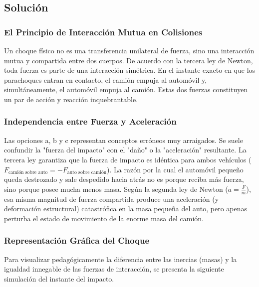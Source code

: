 \documentclass[12pt]{article}
\begin{document}
\subsection*{Solución}

\subsubsection*{El Principio de Interacción Mutua en Colisiones}
Un choque físico no es una transferencia unilateral de fuerza, sino una interacción mutua y compartida entre dos cuerpos. De acuerdo con la tercera ley de Newton, toda fuerza es parte de una interacción simétrica. En el instante exacto en que los parachoques entran en contacto, el camión empuja al automóvil y, simultáneamente, el automóvil empuja al camión. Estas dos fuerzas constituyen un par de acción y reacción inquebrantable.

\subsubsection*{Independencia entre Fuerza y Aceleración}
Las opciones a, b y c representan conceptos erróneos muy arraigados. Se suele confundir la "fuerza del impacto" con el "daño" o la "aceleración" resultante. La tercera ley garantiza que la fuerza de impacto es idéntica para ambos vehículos ($F_{\text{camión sobre auto}} = -F_{\text{auto sobre camión}}$). La razón por la cual el automóvil pequeño queda destrozado y sale despedido hacia atrás no es porque reciba más fuerza, sino porque posee mucha menos masa. Según la segunda ley de Newton ($a = \frac{F}{m}$), esa misma magnitud de fuerza compartida produce una aceleración (y deformación estructural) catastrófica en la masa pequeña del auto, pero apenas perturba el estado de movimiento de la enorme masa del camión.

\subsubsection*{Representación Gráfica del Choque}
Para visualizar pedagógicamente la diferencia entre las inercias (masas) y la igualdad innegable de las fuerzas de interacción, se presenta la siguiente simulación del instante del impacto.
\end{document}
